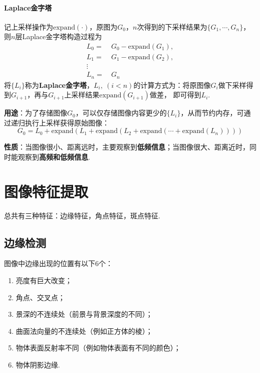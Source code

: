 \documentclass[12pt, a4paper, oneside]{ctexart}
\numberwithin{equation}{section}  %
\theoremstyle{definition}
\begin{document}
\paragraph{Laplace金字塔}记上采样操作为$\text{expand}(\cdot)$，原图为$G_0$，$n$次得到的下采样结果为$\{G_1,\cdots,G_n\}$，
则$n$层Laplace金字塔构造过程为
\begin{align*}
    L_0 =&\ G_0 - \text{expand}(G_1),\\
    L_1 =&\ G_1 - \text{expand}(G_2),\\
    \vdots\ &\\
    L_n =&\ G_n
\end{align*}
将$\{L_i\}$称为\textbf{Laplace金字塔}，$L_i,\ (i < n)$的计算方式为：将原图像$G_{i}$做下采样得到$G_{i+1}$，再与$G_{i+1}$上采样结果$\text{expand}(G_{i+1})$做差，
即可得到$L_i$.

\textbf{用途}：为了存储图像$G_0$，可以仅存储图像内容更少的$\{L_i\}$，从而节约内存，可通过递归执行上采样获得原始图像：
\begin{equation*}
    G_0 = L_0+\text{expand}(L_1+\text{expand}(L_2+\text{expand}(\cdots+\text{expand}(L_n))))
\end{equation*}

\textbf{性质}：当图像很小、距离远时，主要观察到\textbf{低频信息}；当图像很大、距离近时，同时能观察到\textbf{高频和低频信息}.

\section{图像特征提取}
总共有三种特征：边缘特征，角点特征，斑点特征.
\subsection{边缘检测}
图像中边缘出现的位置有以下$6$个：
\begin{enumerate}
    \item 亮度有巨大改变；
    \item 角点、交叉点；
    \item 景深的不连续处（前景与背景深度的不同）；
    \item 曲面法向量的不连续处（例如正方体的棱）；
    \item 物体表面反射率不同（例如物体表面有不同的颜色）；
    \item 物体阴影边缘.
\end{enumerate}
\end{document}
